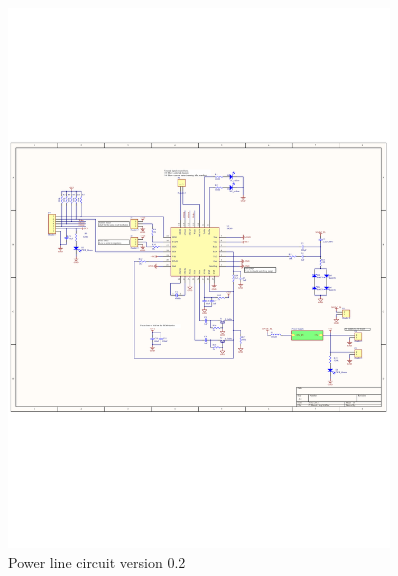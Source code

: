 \begin{figure}[H]
	\begin{centering}
		 \includegraphics[width=0.9\textwidth,page=1,angle=0]{images/SIG60_v0_2}
		\caption{Power line circuit version 0.2}
	\end{centering}
\end{figure}

